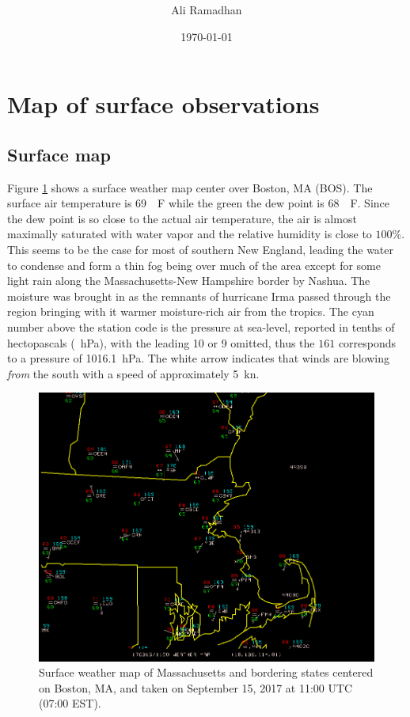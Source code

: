 \documentclass[11pt]{article}
\title{\spacedlowsmallcaps{\small 12.818: Introduction to Atmospheric Data and Large-scale Dynamics}\\ \spacedlowsmallcaps{\large Project one: Surface and upper air observations}}
\author{Ali Ramadhan}
\date{\today}
\begin{document}
\chead{}
\cfoot{\thepage}
\renewcommand{\headrulewidth}{0pt}

\maketitle

\section{Map of surface observations}
\subsection*{Surface map}
Figure \ref{fig:surfaceMap} shows a surface weather map center over Boston, MA (BOS). The surface air temperature is \SI{69}{\SIUnitSymbolDegree\F} while the green the dew point is \SI{68}{\SIUnitSymbolDegree\F}. Since the dew point is so close to the actual air temperature, the air is almost maximally saturated with water vapor and the relative humidity is close to $100\%$. This seems to be the case for most of southern New England, leading the water to condense and form a thin fog being over much of the area except for some light rain along the Massachusetts-New Hampshire border by Nashua. The moisture was brought in as the remnants of hurricane Irma passed through the region bringing with it warmer moisture-rich air from the tropics. The cyan number above the station code is the pressure at sea-level, reported in tenths of hectopascals (\SI{}{\hecto\Pa}), with the leading 10 or 9 omitted, thus the $161$ corresponds to a pressure of \SI{1016.1}{\hecto\Pa}. The white arrow indicates that winds are blowing \emph{from} the south with a speed of approximately \SI{5}{\knot}.

\begin{figure}
  \centering
  \includegraphics[width=\textwidth]{surfaceMapBOS.png}
  \caption{Surface weather map of Massachusetts and bordering states centered on Boston, MA, and taken on September 15, 2017 at 11:00 UTC (07:00 EST).}
  \label{fig:surfaceMap}
\end{figure}
\end{document}
